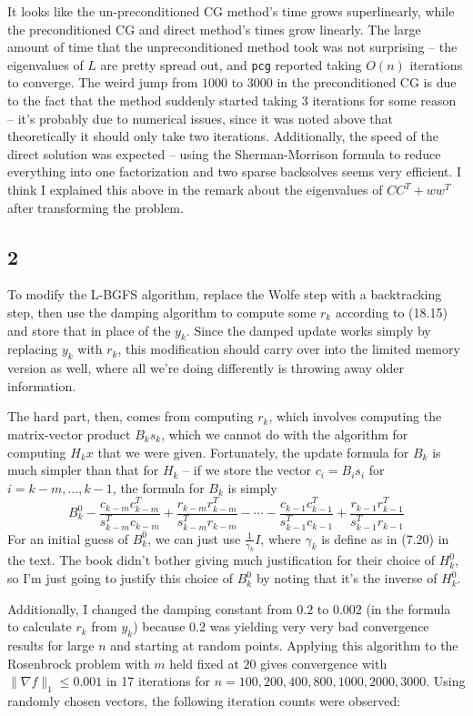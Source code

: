 \documentclass{article}
\begin{document}
It looks like the un-preconditioned CG method's time grows superlinearly, while the preconditioned CG and direct method's times grow linearly. The large amount of time that the unpreconditioned method took was not surprising -- the eigenvalues of $L$ are pretty spread out, and \verb|pcg| reported taking $O(n)$ iterations to converge. 
The weird jump from $1000$ to $3000$ in the preconditioned CG is due to the fact that the method suddenly started taking 3 iterations for some reason -- it's probably due to numerical issues, since it was noted above that theoretically it should only take two iterations. Additionally, the speed of the direct solution was expected -- using the Sherman-Morrison formula to reduce everything into one factorization and two sparse backsolves seems very efficient.
I think I explained this above in the remark about the eigenvalues of $CC^T+ww^T$ after transforming the problem.
\subsection*{2}
To modify the L-BGFS algorithm, replace the Wolfe step with a backtracking step, then use the damping algorithm to compute some $r_k$ according to (18.15) and store that in place of the $y_k$. Since the damped update works simply by replacing $y_k$ with $r_k$, this modification should carry over into the limited memory version as well, where all we're doing differently is throwing away older information.

The hard part, then, comes from computing $r_k$, which involves computing the matrix-vector product $B_ks_k$, which we cannot do with the algorithm for computing $H_kx$ that we were given. Fortunately, the update formula for $B_k$ is much simpler than that for $H_k$ -- if we store the vector $c_i=B_is_i$ for $i=k-m,\ldots,k-1$, the formula for $B_k$ is simply 
\[B_k^0-\frac{c_{k-m}c_{k-m}^T}{s_{k-m}^Tc_{k-m}}+\frac{r_{k-m}r_{k-m}^T}{s_{k-m}^Tr_{k-m}}-\cdots-\frac{c_{k-1}c_{k-1}^T}{s_{k-1}^Tc_{k-1}}+\frac{r_{k-1}r_{k-1}^T}{s_{k-1}^Tr_{k-1}}\]
For an initial guess of $B_k^0$, we can just use $\frac{1}{\gamma_k}I$, where $\gamma_k$ is define as in (7.20) in the text. The book didn't bother giving much justification for their choice of $H_k^0$, so I'm just going to justify this choice of $B_k^0$ by noting that it's the inverse of $H_k^0$.

Additionally, I changed the damping constant from $0.2$ to $0.002$ (in the formula to calculate $r_k$ from $y_k$) because $0.2$ was yielding very very bad convergence results for large $n$ and starting at random points.
Applying this algorithm to the Rosenbrock problem with $m$ held fixed at $20$ gives convergence with $\|\nabla f\|_1\leq0.001$ in 17 iterations for $n=100,200,400,800,1000,2000,3000$. Using randomly chosen vectors, the following iteration counts were observed:
\end{document}
